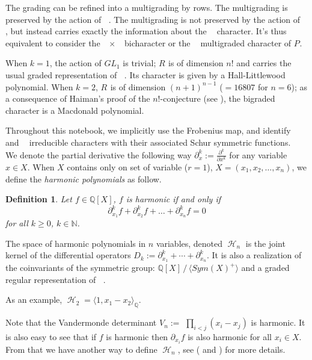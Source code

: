 \documentclass[letter,12pt]{article}
\newcommand{\pauline}[1]{\todo[linecolor=blue,backgroundcolor=blue!25,bordercolor=blue]{#1}}
\newcommand{\NN}{\mathbb{N}}
\newcommand{\QQ}{\mathbb{Q}}
\DeclareMathOperator{\Sn}{\mathbb{S}_n}
\DeclareMathOperator{\GLr}{GL_r}
\DeclareMathOperator{\harmonics}{\mathcal{H}}
\newtheorem{definition}{Definition}
\begin{document}
	The grading can be refined into a multigrading by rows. The multigrading is preserved by the action of $\Sn$. The multigrading is not preserved by the action of $\GLr$, but instead carries exactly the information about the $\GLr$ character. It's thus equivalent to consider the $\GLr \times \Sn$ bicharacter or the $\Sn$ multigraded character of $P_{\Sn}$.
	
	When $k=1$, the action of $GL_1$ is trivial; $R_{\Sn}$ is of dimension $n!$ and carries the usual graded representation of $\Sn$. Its character is given by a Hall-Littlewood polynomial.
	When $k=2$, $R_{\Sn}$ is of dimension $(n+1)^{n-1}$ ($=16807$ for $n=6$); as a consequence of Haiman's proof of the $n!$-conjecture (see \cite{Haiman2002}), the bigraded character is a Macdonald polynomial.
	
	Throughout this notebook, we implicitly use the Frobenius map, and identify $\Sn$ and $\GLr$ irreducible characters with their associated Schur symmetric functions. \\
	
	We denote the partial derivative the following way $\partial^k_x := \frac{\partial^k}{\partial x^k}$ for any variable $x \in X$.
	When $X$ contains only on set of variable ($r=1$), $X = (x_1, x_2, \dots, x_n)$, we define the \emph{harmonic polynomials} as follow.
	
	\begin{definition}
		Let $f \in \QQ[X]$, $f$ is \emph{harmonic} if and only if
		$$\partial^k_{x_1} f + \partial^k_{x_2} f + \dots + \partial^k_{x_n} f = 0 $$
		for all $k \geq 0$, $k \in \NN$.
	\end{definition}

	The space of harmonic polynomials in $n$ variables, denoted $\harmonics_{n}$ is the joint kernel of the differential operators $D_k := \partial_{x_1}^k + \cdots + \partial_{x_n}^k$. It is also a realization of the coinvariants of the symmetric group: $\QQ[X]\, /\, \langle Sym(X)^+ \rangle$ \pauline{$= \QQ[X] / \mathcal{I}_n$} and a graded regular representation of $\Sn$. 
	
	As an example, $\harmonics_2 = \langle 1, x_1-x_2 \rangle_\QQ$. 
	
	Note that the Vandermonde determinant $V_n:=$ $\prod_{i<j}(x_i-x_j)$ is harmonic. It is also easy to see that if $f$ is harmonic then $\partial_{x_i} f$ is also harmonic for all $x_i \in X$. From that we have another way to define $\harmonics_{n}$, see (\cite{Haiman2002} and \cite{Bergeron2009}) for more details. 
	
\end{document}
